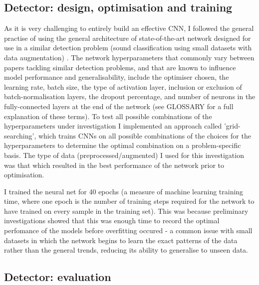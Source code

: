\documentclass[11pt]{article}
\begin{document}
\subsection{Detector: design, optimisation and training}

As it is very challenging to entirely build an effective CNN, I followed the general practise of using the general architecture of state-of-the-art network designed for use in a similar detection problem (sound classification using small datasets with data augmentation) \citep{salamon2017deep}. The network hyperparameters that commonly vary between papers tackling similar detection problems, and that are known to influence model performance and generalisability, include the optimiser chosen, the learning rate, batch size, the type of activation layer, inclusion or exclusion of batch-normalisation layers, the dropout percentage, and number of neurons in the fully-connected layers at the end of the network (see GLOSSARY for a full explanation of these terms). To test all possible combinations of the hyperparameters under investigation I implemented an approach called 'grid-searching', which trains CNNs on all possible combinations of the choices for the hyperparameters to determine the optimal combination on a problem-specific basis. The type of data (preprocessed/augmented) I used for this investigation was that which resulted in the best performance of the network prior to optimisation. 

I trained the neural net for 40 epochs (a measure of machine learning training time, where one epoch is the number of training steps required for the network to have trained on every sample in the training set). This was because preliminary investigations showed that this was enough time to record the optimal perfomance of the models before overfitting occured - a common issue with small datasets in which the network begins to learn the exact patterns of the data rather than the general trends, reducing its ability to generalise to unseen data.  

\subsection{Detector: evaluation}
\end{document}
